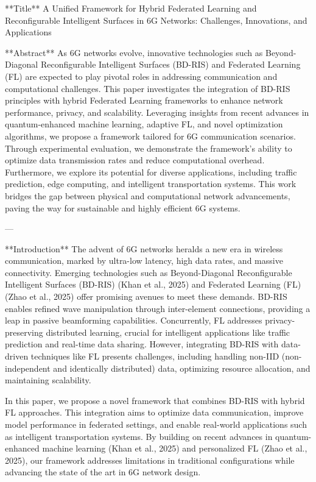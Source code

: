 **Title**  
A Unified Framework for Hybrid Federated Learning and Reconfigurable Intelligent Surfaces in 6G Networks: Challenges, Innovations, and Applications  

**Abstract**  
As 6G networks evolve, innovative technologies such as Beyond-Diagonal Reconfigurable Intelligent Surfaces (BD-RIS) and Federated Learning (FL) are expected to play pivotal roles in addressing communication and computational challenges. This paper investigates the integration of BD-RIS principles with hybrid Federated Learning frameworks to enhance network performance, privacy, and scalability. Leveraging insights from recent advances in quantum-enhanced machine learning, adaptive FL, and novel optimization algorithms, we propose a framework tailored for 6G communication scenarios. Through experimental evaluation, we demonstrate the framework's ability to optimize data transmission rates and reduce computational overhead. Furthermore, we explore its potential for diverse applications, including traffic prediction, edge computing, and intelligent transportation systems. This work bridges the gap between physical and computational network advancements, paving the way for sustainable and highly efficient 6G systems.  

---

**Introduction**  
The advent of 6G networks heralds a new era in wireless communication, marked by ultra-low latency, high data rates, and massive connectivity. Emerging technologies such as Beyond-Diagonal Reconfigurable Intelligent Surfaces (BD-RIS) (Khan et al., 2025) and Federated Learning (FL) (Zhao et al., 2025) offer promising avenues to meet these demands. BD-RIS enables refined wave manipulation through inter-element connections, providing a leap in passive beamforming capabilities. Concurrently, FL addresses privacy-preserving distributed learning, crucial for intelligent applications like traffic prediction and real-time data sharing. However, integrating BD-RIS with data-driven techniques like FL presents challenges, including handling non-IID (non-independent and identically distributed) data, optimizing resource allocation, and maintaining scalability.  

In this paper, we propose a novel framework that combines BD-RIS with hybrid FL approaches. This integration aims to optimize data communication, improve model performance in federated settings, and enable real-world applications such as intelligent transportation systems. By building on recent advances in quantum-enhanced machine learning (Khan et al., 2025) and personalized FL (Zhao et al., 2025), our framework addresses limitations in traditional configurations while advancing the state of the art in 6G network design.  

